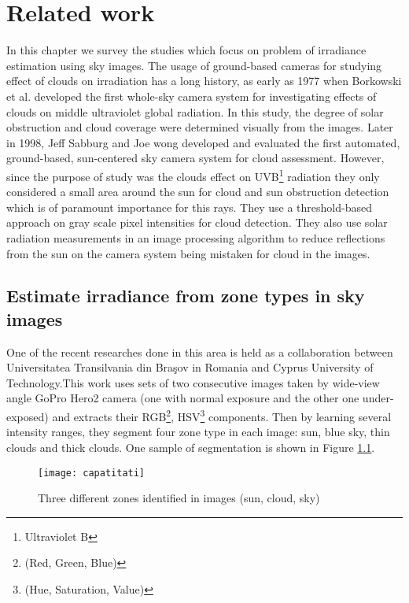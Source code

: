 \chapter{Related work}
\label{sec:related_work_chapter}
In this chapter we survey the studies which focus on problem of irradiance estimation using sky images. The usage of ground-based cameras for studying effect of clouds on irradiation has a long history, as early as 1977 when Borkowski et al.\cite{Borkowski1977} developed the first whole-sky camera system for investigating effects of clouds on middle ultraviolet global radiation. In this study, the degree of solar obstruction and cloud coverage were determined visually from the images. Later in 1998, Jeff Sabburg and Joe wong\cite{Sabburg1998} developed and evaluated the first automated, ground-based, sun-centered sky camera system for cloud assessment. However, since the purpose of study was the clouds effect on UVB\footnote{Ultraviolet B} radiation they only considered a small area around the sun for cloud and sun obstruction detection which is of paramount importance for this rays. They use a threshold-based approach on gray scale pixel intensities for cloud detection. They also use solar radiation measurements in an image processing algorithm to reduce reflections from the sun on the camera system being mistaken for cloud in the images.

\section{Estimate irradiance from zone types in sky images}
One of the recent researches done in this area is held as a collaboration between Universitatea Transilvania din Braşov in Romania and Cyprus University of Technology\cite{romania_paper, romania_report}.This work uses sets of two consecutive images taken by wide-view angle GoPro Hero2 camera (one with normal exposure and the other one under-exposed) and extracts their RGB\footnote{(Red, Green, Blue)}, HSV\footnote{(Hue, Saturation, Value)} components. Then by learning several intensity ranges, they segment four zone type in each image: sun, blue sky, thin clouds and thick clouds. One sample of segmentation is shown in Figure \ref{fig:capatitati}.

\begin{figure}[h] 
\caption{Three different zones identified in images (sun, cloud, sky)}
\label{fig:capatitati}
\texttt{[image: capatitati]}
\centering
\end{figure} 

